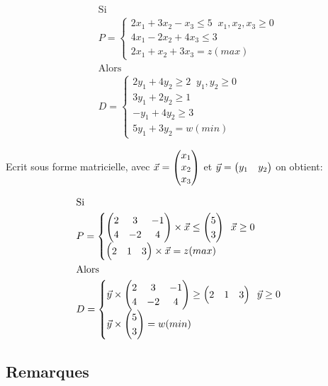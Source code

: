 \documentclass[a4paper, 11pt]{article}
\begin{document}
\[
  \begin{aligned}
  &\text{Si} \\
  &P =
  \begin{cases}
    2x_1 + 3x_2 -  x_3 \le 5 \;\; x_1, x_2, x_3 \ge 0 \\
    4x_1 - 2x_2 + 4x_3 \le 3\\
    2x_1 +  x_2 + 3x_3 = z (max)
  \end{cases}  \\
  &\text{Alors} \\
  &D =
  \begin{cases}
     2y_1 + 4y_2 \ge 2 \;\; y_1, y_2 \ge 0 \\
     3y_1 + 2y_2 \ge 1 \\
    - y_1 + 4y_2 \ge 3 \\
    5y_1 + 3y_2 = w (min)
  \end{cases}
  \end{aligned}
\]

\newpage

Ecrit sous forme matricielle, avec $\vec{x} = \begin{pmatrix} x_1 \\ x_2 \\ x_3 \end{pmatrix}$ et $\vec{y} = \begin{pmatrix} y_1 & y_2 \end{pmatrix}$ on obtient:

\[
  \begin{aligned}
  &\text{Si} \\
  &P =
  \begin{cases}
    \begin{pmatrix}
       2 &  3 & -1 \\
       4 & -2 &  4
    \end{pmatrix} \times \vec{x} \le \begin{pmatrix} 5 \\ 3 \end{pmatrix} \;\; \vec{x} \ge 0 \\
    \begin{pmatrix} 2 & 1 & 3 \end{pmatrix} \times \vec{x} = z (max)
  \end{cases}  \\
  &\text{Alors} \\
  &D =
  \begin{cases}
    \vec{y} \times
    \begin{pmatrix}
      2 & 3 & -1 \\
      4 & -2 & 4
    \end{pmatrix} \ge \begin{pmatrix} 2 & 1 & 3 \end{pmatrix} \;\; \vec{y} \ge 0 \\
    \vec{y} \times \begin{pmatrix} 5 \\ 3 \end{pmatrix} = w (min)
  \end{cases}
  \end{aligned}
\]

\subsection{Remarques}
\end{document}
